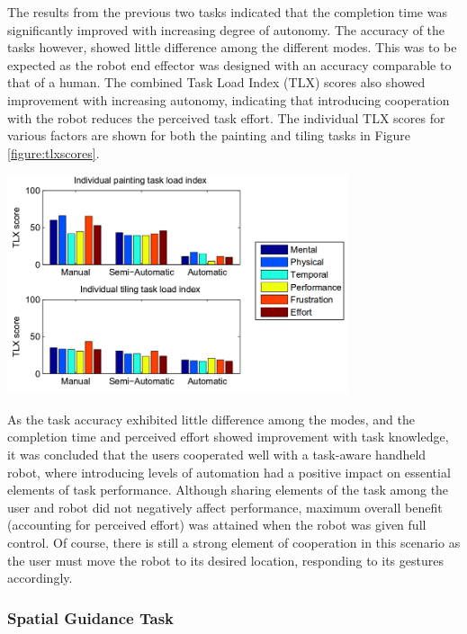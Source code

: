 \documentclass[11pt]{article}
\begin{document}
The results from the previous two tasks indicated that the completion time was significantly improved with increasing degree of autonomy. The accuracy of the tasks however, showed little difference among the different modes. This was to be expected as the robot end effector was designed with an accuracy comparable to that of a human. The combined Task Load Index (TLX) scores also showed improvement with increasing autonomy, indicating that introducing cooperation with the robot reduces the perceived task effort. The individual TLX scores for various factors are shown for both the painting and tiling tasks in Figure \ref{figure:tlxscores}.

\begin{center}
\includegraphics[width = 0.75\textwidth]{tlxscores.png}
\label{figure:tlxscores}
\end{center}

As the task accuracy exhibited little difference among the modes, and the completion time and perceived effort showed improvement with task knowledge, it was concluded that the users cooperated well with a task-aware handheld robot, where introducing levels of automation had a positive impact on essential elements of task performance. Although sharing elements of the task among the user and robot did not negatively affect performance, maximum overall benefit (accounting for perceived effort) was attained when the robot was given full control. Of course, there is still a strong element of cooperation in this scenario as the user must move the robot to its desired location, responding to its gestures accordingly.
	
\subsubsection{Spatial Guidance Task}
\end{document}
